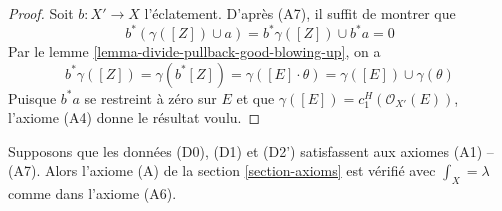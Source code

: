 \begin{proof}
Soit $b : X' \to X$ l'éclatement. D'après (A7), il suffit de montrer
que
$$
b^*(\gamma([Z]) \cup a) = b^*\gamma([Z]) \cup b^*a = 0
$$
Par le lemme \ref{lemma-divide-pullback-good-blowing-up}, on a
$$
b^*\gamma([Z]) = \gamma(b^*[Z]) =
\gamma([E] \cdot \theta) =
\gamma([E]) \cup \gamma(\theta)
$$
Puisque $b^*a$ se restreint à zéro sur $E$ et que
$\gamma([E]) = c^H_1(\mathcal{O}_{X'}(E))$, l'axiome (A4) donne le résultat voulu.
\end{proof}

\begin{lemma}
\label{lemma-poincare-duality}
Supposons que les données (D0), (D1) et (D2') satisfassent aux axiomes (A1) -- (A7).
Alors l'axiome (A) de la section \ref{section-axioms} est vérifié avec
$\int_X = \lambda$ comme dans l'axiome (A6).
\end{lemma}

